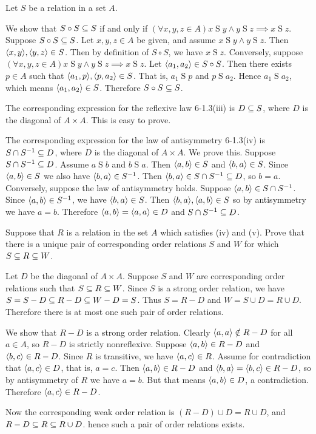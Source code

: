 \begin{solution}
Let $S$ be a relation in a set $A$.

We show that $S\circ S\subseteq S$ if and only if
$(\forall x,y,z\in A) x\mathrel S y\land y\mathrel S z \implies x\mathrel S z$.
Suppose $S\circ S\subseteq S$. Let $x,y,z\in A$ be given, and assume $x\mathrel S y\land y\mathrel S z$.
Then $\aprn{x,y},\aprn{y,z}\in S$.
Then by definition of $S\circ S$, we have $x\mathrel S z$.
Conversely, suppose $(\forall x,y,z\in A) x\mathrel S y\land y\mathrel S z \implies x\mathrel S z$.
Let $\left\langle a_1,a_2\right\rangle\in S\circ S$. Then there exists $p\in A$ such that $\aprn{a_1,p},\aprn{p,a_2}\in S$.
That is, $a_1\mathrel S p$ and $p\mathrel S a_2$.
Hence $a_1 \mathrel S a_2$, which means $\left\langle a_1,a_2\right\rangle\in S$. Therefore $S\circ S\subseteq S$.

The corresponding expression for the reflexive law 6-1.3(iii) is $D\subseteq S$, where $D$ is the diagonal of $A\times A$.
This is easy to prove.

The corresponding expression for the law of antisymmetry 6-1.3(iv) is $S\cap S^{-1}\subseteq D$,
where $D$ is the diagonal of $A\times A$. We prove this. Suppose $S\cap S^{-1}\subseteq D$. Assume $a\mathrel S b$
and $b\mathrel S a$.
Then $\left\langle a,b\right\rangle\in S$ and $\left\langle b,a\right\rangle\in S$.
Since $\left\langle a,b\right\rangle\in S$ we also have $\left\langle b,a\right\rangle\in S^{-1}$.
Then $\left\langle b,a\right\rangle\in S\cap S^{-1}\subseteq D$, so $b=a$.
Conversely, suppose the law of antisymmetry holds.
Suppose $\left\langle a,b\right\rangle\in S\cap S^{-1}$.
Since $\left\langle a,b\right\rangle\in S^{-1}$, we have $\left\langle b,a\right\rangle\in S$.
Then $\aprn{b,a},\aprn{a,b}\in S$ so by antisymmetry we have $a=b$.
Therefore $\left\langle a,b\right\rangle=\left\langle a,a\right\rangle\in D$ and $S\cap S^{-1}\subseteq D$.
\end{solution}

\begin{exercise}
Suppose that $R$ is a relation in the set $A$ which satisfies (iv) and (v). Prove that there
is a unique pair of corresponding order relations $S$ and $W$ for which $S\subseteq R\subseteq W$.
\end{exercise}

\begin{solution}
Let $D$ be the diagonal of $A\times A$. Suppose $S$ and $W$ are corresponding order relations
such that $S\subseteq R \subseteq W$.
Since $S$ is a strong order relation, we have $S=S-D\subseteq R-D\subseteq W-D = S$.
Thus $S=R-D$ and $W=S\cup D=R\cup D$.
Therefore there is at most one such pair of order relations.

We show that $R-D$ is a strong order relation. Clearly $\left\langle a,a\right\rangle\notin R-D$ for all $a\in A$,
so $R-D$ is strictly nonreflexive.
Suppose $\left\langle a,b\right\rangle\in R-D$ and $\left\langle b,c\right\rangle\in R-D$.
Since $R$ is transitive, we have $\left\langle a,c\right\rangle\in R$.
Assume for contradiction that $\left\langle a,c\right\rangle\in D$, that is, $a=c$.
Then $\left\langle a,b\right\rangle\in R-D$ and $\left\langle b,a\right\rangle=\left\langle b,c\right\rangle\in R-D$,
so by antisymmetry of $R$ we have $a=b$. But that means $\left\langle a,b\right\rangle\in D$, a contradiction.
Therefore $\left\langle a,c\right\rangle\in R-D$.

Now the corresponding weak order relation is $(R-D)\cup D=R\cup D$, and $R-D\subseteq R\subseteq R\cup D$.
hence such a pair of order relations exists.
\end{solution}

